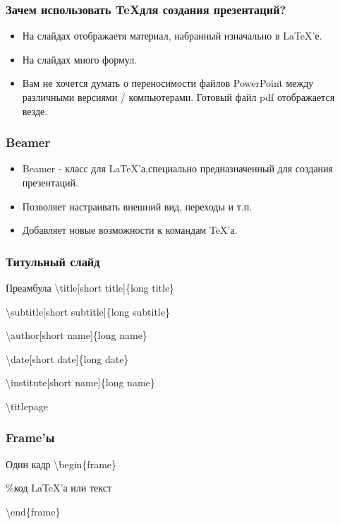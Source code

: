 \documentclass[russian, 14pt]{beamer}
\begin{document}
\begin{frame}
	\frametitle{Зачем использовать \TeX  для создания презентаций?}
	\begin{itemize}
		\item На слайдах отображаетя материал, набранный изначально в \LaTeX'е. 
		\item На слайдах много формул.
		\item Вам не хочется думать о переносимости файлов PowerPoint между различными версиями / компьютерами. Готовый файл pdf отображается везде. 
	\end{itemize}
\end{frame}

\begin{frame}
	\frametitle{Beamer}
	\begin{itemize}
		\item Beamer - класс для \LaTeX'а,специально предназначенный для создания презентаций.
		\item Позволяет настраивать внешний вид, переходы и т.п.
		\item Добавляет новые возможности к командам \TeX'а.
	\end{itemize}
\end{frame}

\begin{frame}
	\frametitle{Титульный слайд}
	\begin{block}{Преамбула}
		\textbackslash title[short title]\{long title\}
		
		
		\textbackslash subtitle[short subtitle]\{long subtitle\}
		
		
		\textbackslash author[short name]\{long name\}
		
		
		\textbackslash date[short date]\{long date\}
		
		
		\textbackslash institute[short name]\{long name\}
		
		
		\textbackslash titlepage
	\end{block}
\end{frame}

\begin{frame}
	\frametitle{Frame'ы}
	\begin{block}{Один кадр}
		\textbackslash begin\{frame\}
		
		
		\%код \LaTeX'а или текст 
		
		
		\textbackslash end\{frame\}
	\end{block}
\end{frame}
\end{document}

